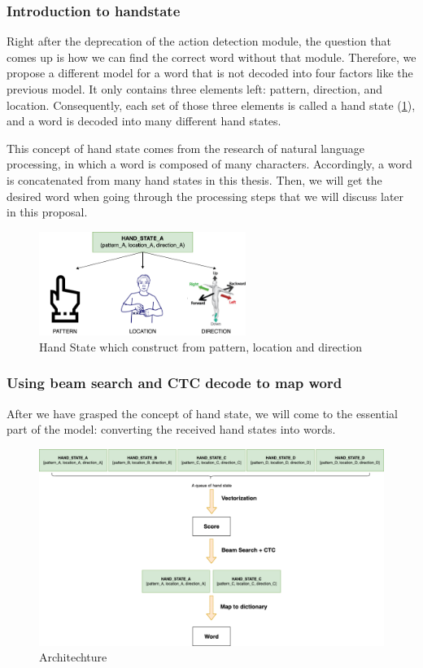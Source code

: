 \subsubsection{ Introduction to handstate }\label{sec:handstate}

Right after the deprecation of the action detection module, the question that comes up is how we can find the correct word without that module. Therefore, we propose a different model for a word that is not decoded into four factors like the previous model. It only contains three elements left: pattern, direction, and location. Consequently, each set of those three elements is called a hand state (\ref{fig:Chap4-HandState}), and a word is decoded into many different hand states.

This concept of hand state comes from the research of natural language processing, in which a word is composed of many characters. Accordingly, a word is concatenated from many hand states in this thesis. Then, we will get the desired word when going through the processing steps that we will discuss later in this proposal.

\begin{figure}[H]
  \centering
  \includegraphics[width=0.6\textwidth]{img/Chap4/HandState.png}
  \caption{ Hand State which construct from pattern, location and direction}
  \label{fig:Chap4-HandState}
\end{figure}

\subsubsection{ Using beam search and CTC decode to map word}

After we have grasped the concept of hand state, we will come to the essential part of the model: converting the received hand states into words.
      
\begin{figure}[H]
  \centering
  \includegraphics[width=\textwidth]{img/Chap4/Architechture.png}
  \caption{Architechture}
  \label{fig:Chap4-Architechture}
\end{figure}

